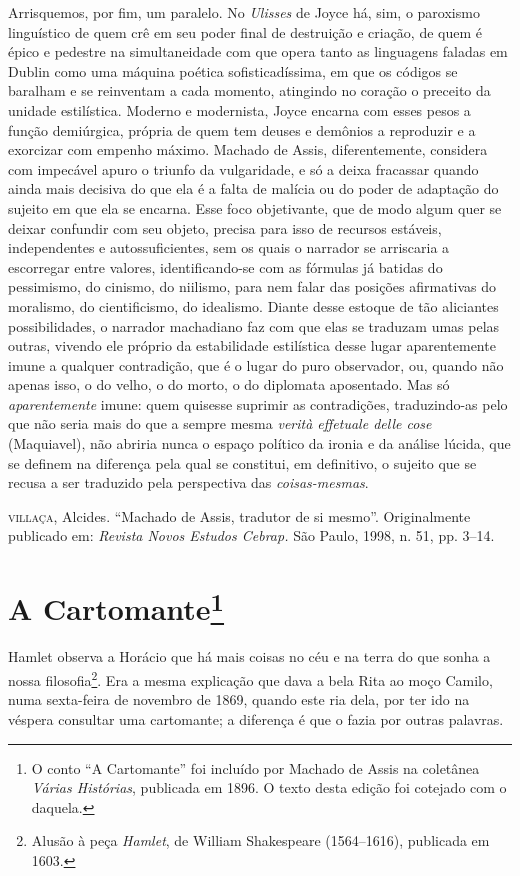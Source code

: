 Arrisquemos, por fim, um paralelo. No \emph{Ulisses} de Joyce há, sim, o
paroxismo linguístico de quem crê em seu poder final de destruição e
criação, de quem é épico e pedestre na simultaneidade com que opera
tanto as linguagens faladas em Dublin como uma máquina poética
sofisticadíssima, em que os códigos se baralham e se reinventam a cada
momento, atingindo no coração o preceito da unidade estilística. Moderno
e modernista, Joyce encarna com esses pesos a função demiúrgica, própria
de quem tem deuses e demônios a reproduzir e a exorcizar com empenho
máximo. Machado de Assis, diferentemente, considera com impecável apuro
o triunfo da vulgaridade, e só a deixa fracassar quando ainda mais
decisiva do que ela é a falta de malícia ou do poder de adaptação do
sujeito em que ela se encarna. Esse foco objetivante, que de modo algum
quer se deixar confundir com seu objeto, precisa para isso de recursos
estáveis, independentes e autossuficientes, sem os quais o narrador se
arriscaria a escorregar entre valores, identificando-se com as fórmulas
já batidas do pessimismo, do cinismo, do niilismo, para nem falar das
posições afirmativas do moralismo, do cientificismo, do idealismo.
Diante desse estoque de tão aliciantes possibilidades, o narrador
machadiano faz com que elas se traduzam umas pelas outras, vivendo ele
próprio da estabilidade estilística desse lugar aparentemente imune a
qualquer contradição, que é o lugar do puro observador, ou, quando não
apenas isso, o do velho, o do morto, o do diplomata aposentado. Mas só
\emph{aparentemente} imune: quem quisesse suprimir as contradições,
traduzindo-as pelo que não seria mais do que a sempre mesma \emph{verità
effetuale delle cose} (Maquiavel), não abriria nunca o espaço político
da ironia e da análise lúcida, que se definem na diferença pela qual se
constitui, em definitivo, o sujeito que se recusa a ser traduzido pela
perspectiva das \emph{coisas-mesmas}.

\textsc{villaça}, Alcides. ``Machado de Assis, tradutor de si mesmo''.
Originalmente publicado em: \emph{Revista Novos Estudos Cebrap.} São
Paulo, 1998, n. 51, pp. 3--14.

\chapter{A Cartomante\footnote[*]{O conto ``A Cartomante'' foi incluído por
  Machado de Assis na coletânea \emph{Várias Histórias}, publicada em
  1896. O texto desta edição foi cotejado com o daquela.}}

Hamlet observa a Horácio que há mais coisas no céu e na terra do que
sonha a nossa filosofia\footnote{Alusão à peça \emph{Hamlet}, de William
  Shakespeare (1564--1616), publicada em 1603.}. Era a mesma explicação
que dava a bela Rita ao moço Camilo, numa sexta-feira de novembro de
1869, quando este ria dela, por ter ido na véspera consultar uma
cartomante; a diferença é que o fazia por outras palavras.

